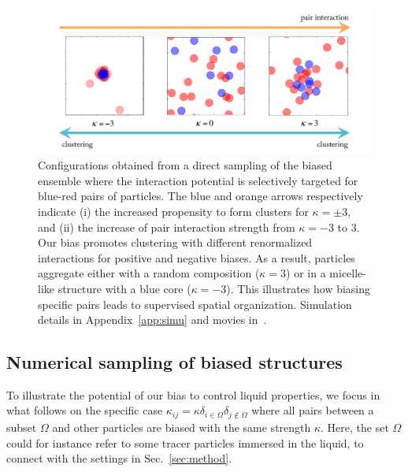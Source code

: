 \documentclass[superscriptaddress, twocolumn, prx, longbibliography, nofootinbib]{revtex4-1}
\begin{document}
\begin{figure}
	\centering
	\includegraphics[width=.9\linewidth]{fig4.pdf}
	\caption{\label{fig:outofperturbation}
	Configurations obtained from a direct sampling of the biased ensemble where the interaction potential is selectively targeted for blue-red pairs of particles. The blue and orange arrows respectively indicate (i) the increased propensity to form clusters for $\kappa=\pm3$, and (ii) the increase of pair interaction strength from $\kappa=-3$ to $3$. Our bias promotes clustering with different renormalized interactions for positive and negative biases. As a result, particles aggregate either with a random composition ($\kappa=3$) or in a micelle-like structure with a blue core ($\kappa=-3$). This illustrates how biasing specific pairs leads to supervised spatial organization.
		Simulation details in Appendix~\ref{app:simu} and movies in~\cite{movie}.
	}
\end{figure}


\subsection{Numerical sampling of biased structures}

To illustrate the potential of our bias to control liquid properties, we focus in what follows on the specific case $\kappa_{ij}=\kappa\delta_{i\in\Omega}\delta_{j\not\in\Omega}$ where all pairs between a subset $\Omega$ and other particles are biased with the same strength $\kappa$. Here, the set $\Omega$ could for instance refer to some tracer particles immersed in the liquid, to connect with the settings in Sec.~\ref{sec:method}. 
\end{document}
